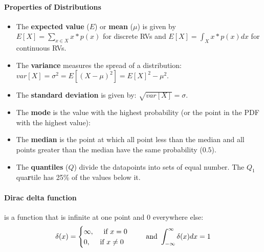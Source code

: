 \documentclass[../main.tex]{subfiles}
\begin{document}
        \paragraph{Properties of Distributions} 
            \begin{itemize}
                \item[] The \textbf{expected value}  ($E$) or \textbf{mean} ($\mu$) is given by $E[X] = \sum_{x \in X} x*p(x)$ for discrete RVs and $E[X] = \int_X x*p(x) dx$ for continuous RVs.
                \item[] The \textbf{variance}  measures the spread of a distribution: $var[X] = \sigma^2 = E[(X-\mu)^2] = E[X]^2 - \mu^2$.
                \item[] The \textbf{standard deviation}  is given by: $\sqrt{var[X]} = \sigma$.
                \item[] The \textbf{mode}  is the value with the highest probability (or the point in the PDF with the highest value): 
                \item[] The \textbf{median}  is the point at which all point less than the median and all points greater than the median have the same probability ($0.5$). 
                \item[] The \textbf{quantiles} ($Q$)  divide the datapoints into sets of equal number. The $Q_1$ qua\textbf{r}tile has 25\% of the values below it. 
            \end{itemize}

        \paragraph{Dirac delta function}  \label{diracdelta} is a function that is infinite at one point and 0 everywhere else: $$\delta(x)=\begin{cases} \infty , \text{\hspace{1em} if } x = 0 \\0, \text{\hspace{1em} if } x \neq 0 \end{cases} \text{\hspace{1em} and } \int_{-\infty}^{\infty} \delta(x) dx = 1$$
\end{document}
